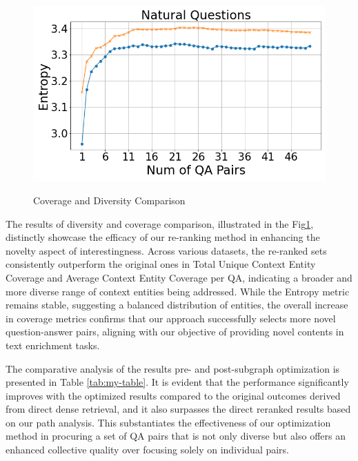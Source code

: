 \documentclass[11pt]{article}
\begin{document}
\begin{figure}[h!]
\begin{minipage}[h]{0.33\linewidth}
        \includegraphics[width=\textwidth]{submissions/Tung2023/figs/Natural Questions_Entropy.png}
    \label{fig:narrativeqa-entropy}
    \end{minipage}
 
\caption{Coverage and Diversity Comparison}
\label{fig:dataset-comparisons}
\end{figure}



The results of diversity and coverage comparison, illustrated in the Fig\ref{fig:dataset-comparisons}, distinctly showcase the efficacy of our re-ranking method in enhancing the novelty aspect of interestingness. Across various datasets, the re-ranked sets consistently outperform the original ones in Total Unique Context Entity Coverage and Average Context Entity Coverage per QA, indicating a broader and more diverse range of context entities being addressed. While the Entropy metric remains stable, suggesting a balanced distribution of entities, the overall increase in coverage metrics confirms that our approach successfully selects more novel question-answer pairs, aligning with our objective of providing novel contents in text enrichment tasks.


The comparative analysis of the results pre- and post-subgraph optimization is presented in Table \ref{tab:my-table}. It is evident that the performance significantly improves with the optimized results compared to the original outcomes derived from direct dense retrieval, and it also surpasses the direct reranked results based on our path analysis. This substantiates the effectiveness of our optimization method in procuring a set of QA pairs that is not only diverse but also offers an enhanced collective quality over focusing solely on individual pairs.
\end{document}
